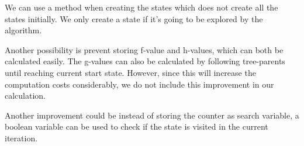 \documentclass{article}
\begin{document}
We can use a method when creating the states which does not  create all the states initially. We only create a state if it's going to be explored by the algorithm.

Another possibility is prevent storing f-value and h-values, which can both be calculated easily. The g-values can also be calculated by following tree-parents until reaching current start state. However, since this will increase the computation costs considerably, we do not include this improvement in our calculation. 

 Another improvement could be instead of storing the counter as search variable, a boolean variable can be used to check if the state is visited in the current iteration.
\end{document}
